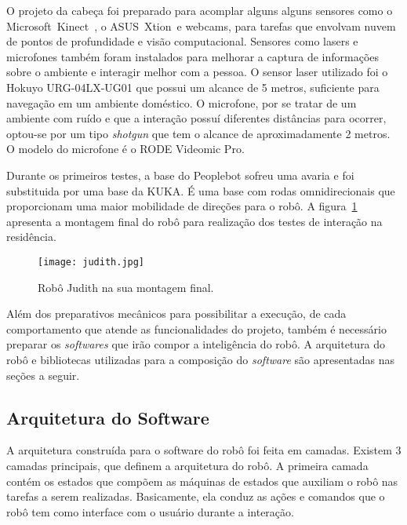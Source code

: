 O projeto da cabeça foi preparado para acomplar alguns alguns sensores como o Microsoft\textregistered\ Kinect\textregistered\ , o ASUS\textregistered\ Xtion\textregistered\ e webcams, para tarefas que envolvam nuvem de pontos de profundidade e visão computacional. Sensores como lasers e microfones também foram instalados para melhorar a captura de informações sobre o ambiente e interagir melhor com a pessoa. O sensor laser utilizado foi o Hokuyo URG-04LX-UG01 que possui um alcance de 5 metros, suficiente para navegação em um ambiente doméstico. O microfone, por se tratar de um ambiente com ruído e que a interação possuí diferentes distâncias para ocorrer, optou-se por um tipo \emph{shotgun} que tem o alcance de aproximadamente 2 metros. O modelo do microfone é o RODE Videomic Pro.

Durante os primeiros testes, a base do Peoplebot sofreu uma avaria e foi substituida por uma base da KUKA. É uma base com rodas omnidirecionais que proporcionam uma maior mobilidade de direções para o robô. A figura~\ref{fig:newjudith} apresenta a montagem final do robô para realização dos testes de interação na residência.

\begin{figure}[ht!]
	\centering
	\begin{minipage}{0.4\textwidth}
		\caption{Robô Judith na sua montagem final.}
		\texttt{[image: judith.jpg]}
		\label{fig:newjudith}
	\end{minipage}
\end{figure}

Além dos preparativos mecânicos para possibilitar a execução, de cada comportamento que atende as funcionalidades do projeto, também é necessário preparar os \emph{softwares} que irão compor a inteligência do robô. A arquitetura do robô e bibliotecas utilizadas para a composição do \emph{software} são apresentadas nas seções a seguir.

\subsection{Arquitetura do Software}
\label{sec:arquitetura}
A arquitetura construída para o software do robô foi feita em camadas. Existem 3 camadas principais, que definem a arquitetura do robô. A primeira camada contém os estados que compõem as máquinas de estados que auxiliam o robô nas tarefas a serem realizadas. Basicamente, ela conduz as ações e comandos que o robô tem como interface com o usuário durante a interação.


